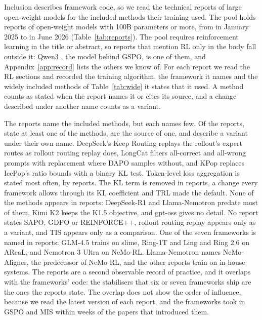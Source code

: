 \documentclass{article}
\begin{document}
Inclusion describes framework code, so we read the technical reports of large open-weight models for the included methods their training used. The pool holds \NReports{} reports of open-weight models with 100B parameters or more, from \ReportFirst{} in January 2025 to \ReportLast{} in June 2026 (Table~\ref{tab:reports}). The pool requires reinforcement learning in the title or abstract, so reports that mention RL only in the body fall outside it: Qwen3 \citep{arxiv250509388}, the model behind GSPO, is one of them, and Appendix~\ref{app:record} lists the others we know of. For each report we read the RL sections and recorded the training algorithm, the framework it names and the widely included methods of Table~\ref{tab:wide} it states that it used. A method counts as stated when the report names it or cites its source, and a change described under another name counts as a variant.

\begin{table}[!htbp]
\centering
\footnotesize
\caption{\textbf{Widely included methods stated by technical reports of open-weight models with 100B parameters or more.} Unit: report in the pool. A check marks a method the report states it used, S marks the report that is the method's source, V a variant described under another name, and T a method tried and not kept. Framework stated is the training system the report names.}
\label{tab:reports}

\end{table}

The reports name the included methods, but each names few. Of the \NReports{} reports, \NReportsUseAny{} state at least one of the \NWideMethods{} methods, \NReportsSource{} are the source of one, and \NReportsVariant{} describe a variant under their own name. DeepSeek's Keep Routing replays the rollout's expert routes as rollout routing replay does, LongCat filters all-correct and all-wrong prompts with replacement where DAPO samples without, and KPop replaces IcePop's ratio bounds with a binary KL test. Token-level loss aggregation is stated most often, by \NRepDapoTokenLoss{} reports. The KL term is removed in \NReportsNoKL{} reports, a change every framework allows through its KL coefficient and TRL made the default. None of the methods appears in \NReportsNone{} reports: DeepSeek-R1 and Llama-Nemotron predate most of them, Kimi K2 keeps the K1.5 objective, and gpt-oss gives no detail. No report states SAPO, GDPO or REINFORCE++, rollout routing replay appears only as a variant, and TIS appears only as a comparison. One of the seven frameworks is named in \NReportsNamedFramework{} reports: GLM-4.5 trains on slime, Ring-1T and Ling and Ring 2.6 on AReaL, and Nemotron 3 Ultra on NeMo-RL. Llama-Nemotron names NeMo-Aligner, the predecessor of NeMo-RL, and the other reports train on in-house systems. The reports are a second observable record of practice, and it overlaps with the frameworks' code: the stabilisers that six or seven frameworks ship are the ones the reports state. The overlap does not show the order of influence, because we read the latest version of each report, and the frameworks took in GSPO and MIS within weeks of the papers that introduced them.
\end{document}
